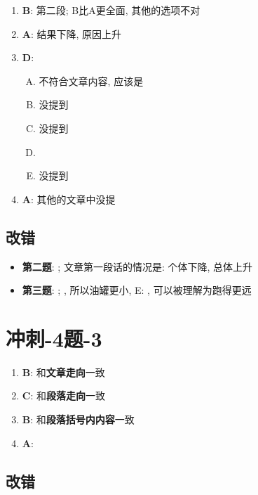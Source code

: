   \begin{enumerate}
    \item \textbf{B}: 第二段; B比A更全面, 其他的选项不对
    \item \textbf{A}: 结果下降, 原因上升
    \item \textbf{D}:
    \begin{enumerate}[A.]
      \item 不符合文章内容, 应该是
      \item 没提到
      \item 没提到
      \item %
      \item 没提到
    \end{enumerate}

    \item \textbf{A}: 其他的文章中没提
  \end{enumerate}

  \subsection{改错}

    \begin{itemize}
      \item \textbf{第二题}: ; 文章第一段话的情况是: 个体下降, 总体上升
      \item \textbf{第三题}: ; , 所以油罐更小, E:
      , 可以被理解为跑得更远
    \end{itemize}

\section{冲刺-4题-3}

  \begin{enumerate}
    \item \textbf{B}: 和\textbf{文章走向}一致
    \item \textbf{C}: 和\textbf{段落走向}一致
    \item \textbf{B}: 和\textbf{段落括号内内容}一致
    \item \textbf{A}:
  \end{enumerate}

  \subsection{改错}


